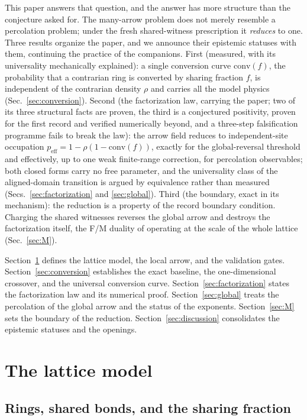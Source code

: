 \documentclass[11pt]{article}
\newcommand{\peff}{p_{\mathrm{eff}}}
\newcommand{\conv}{\mathrm{conv}}
\begin{document}
This paper answers that question, and the answer has more structure than the
conjecture asked for. The many-arrow problem does not merely resemble a
percolation problem; under the fresh shared-witness prescription it
\emph{reduces} to one. Three results organize the paper, and we announce
their epistemic statuses with them, continuing the practice of the
companions. First (measured, with its universality mechanically explained):
a single conversion curve $\conv(f)$, the probability that a contrarian ring
is converted by sharing fraction $f$, is independent of the contrarian
density $\rho$ and carries all the model physics
(Sec.~\ref{sec:conversion}). Second (the factorization law, carrying the paper; two of its three
structural facts are proven, the third is a conjectured positivity,
proven for the first record and verified numerically beyond, and a
three-step falsification programme fails to break the law): the arrow field
reduces to independent-site occupation $\peff = 1 - \rho(1-\conv(f))$,
exactly for the global-reversal threshold and effectively, up to one weak
finite-range correction, for percolation observables; both closed forms
carry no free parameter, and the universality class of the aligned-domain
transition is argued by equivalence rather than measured
(Secs.~\ref{sec:factorization} and \ref{sec:global}). Third (the boundary,
exact in its mechanism): the reduction is a property of the record boundary
condition. Charging the shared witnesses reverses the global arrow and
destroys the factorization itself, the F/M duality of \cite{p2} operating at
the scale of the whole lattice (Sec.~\ref{sec:M}).

Section~\ref{sec:model} defines the lattice model, the local arrow, and the
validation gates. Section~\ref{sec:conversion} establishes the exact
baseline, the one-dimensional crossover, and the universal conversion curve.
Section~\ref{sec:factorization} states the factorization law and its
numerical proof. Section~\ref{sec:global} treats the percolation of the
global arrow and the status of the exponents. Section~\ref{sec:M} sets the
boundary of the reduction. Section~\ref{sec:discussion} consolidates the
epistemic statuses and the openings.

\section{The lattice model}
\label{sec:model}

\subsection{Rings, shared bonds, and the sharing fraction}
\end{document}
